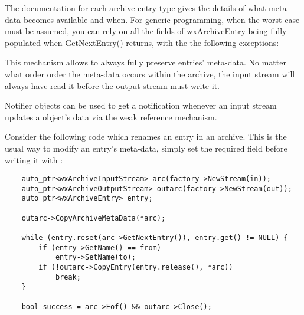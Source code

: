 The documentation for each archive entry type gives the details
of what meta-data becomes available and when. For generic programming,
when the worst case must be assumed, you can rely on all the fields
of wxArchiveEntry being fully populated when GetNextEntry() returns,
with the the following exceptions:

\begin{twocollist}\twocolwidtha{3cm}
\end{twocollist}

This mechanism allows 
to always fully preserve entries' meta-data. No matter what order order
the meta-data occurs within the archive, the input stream will always
have read it before the output stream must write it.


Notifier objects can be used to get a notification whenever an input
stream updates a  object's data
via the weak reference mechanism.

Consider the following code which renames an entry in an archive.
This is the usual way to modify an entry's meta-data, simply set the
required field before writing it with
 :

\begin{verbatim}
    auto_ptr<wxArchiveInputStream> arc(factory->NewStream(in));
    auto_ptr<wxArchiveOutputStream> outarc(factory->NewStream(out));
    auto_ptr<wxArchiveEntry> entry;

    outarc->CopyArchiveMetaData(*arc);

    while (entry.reset(arc->GetNextEntry()), entry.get() != NULL) {
        if (entry->GetName() == from)
            entry->SetName(to);
        if (!outarc->CopyEntry(entry.release(), *arc))
            break;
    }

    bool success = arc->Eof() && outarc->Close();

\end{verbatim}

